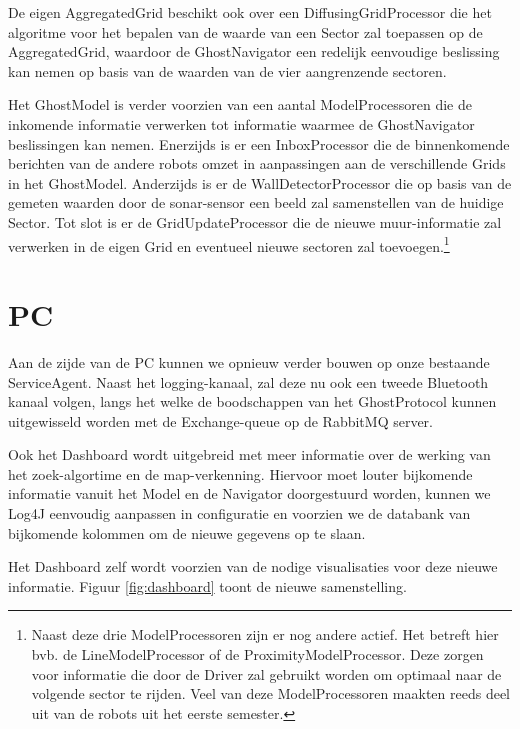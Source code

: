 \documentclass[12pt,a4paper]{report}
\begin{document}
De eigen AggregatedGrid beschikt ook over een DiffusingGridProcessor die het algoritme voor het bepalen van de waarde van een Sector zal toepassen op de AggregatedGrid, waardoor de GhostNavigator een redelijk eenvoudige beslissing kan nemen op basis van de waarden van de vier aangrenzende sectoren.

Het GhostModel is verder voorzien van een aantal ModelProcessoren die de inkomende informatie verwerken tot informatie waarmee de GhostNavigator beslissingen kan nemen. Enerzijds is er een InboxProcessor die de binnenkomende berichten van de andere robots omzet in aanpassingen aan de verschillende Grids in het GhostModel. Anderzijds is er de WallDetectorProcessor die op basis van de gemeten waarden door de sonar-sensor een beeld zal samenstellen van de huidige Sector. Tot slot is er de GridUpdateProcessor die de nieuwe muur-informatie zal verwerken in de eigen Grid en eventueel nieuwe sectoren zal toevoegen.\footnote{Naast deze drie ModelProcessoren zijn er nog andere actief. Het betreft hier bvb. de LineModelProcessor of de ProximityModelProcessor. Deze zorgen voor informatie die door de Driver zal gebruikt worden om optimaal naar de volgende sector te rijden. Veel van deze ModelProcessoren maakten reeds deel uit van de robots uit het eerste semester.}

\section{PC}

Aan de zijde van de PC kunnen we opnieuw verder bouwen op onze bestaande ServiceAgent. Naast het logging-kanaal, zal deze nu ook een tweede Bluetooth kanaal volgen, langs het welke de boodschappen van het GhostProtocol kunnen uitgewisseld worden met de Exchange-queue op de RabbitMQ server.

Ook het Dashboard wordt uitgebreid met meer informatie over de werking van het zoek-algortime en de map-verkenning. Hiervoor moet louter bijkomende informatie vanuit het Model en de Navigator doorgestuurd worden, kunnen we Log4J eenvoudig aanpassen in configuratie en voorzien we de databank van bijkomende kolommen om de nieuwe gegevens op te slaan.

Het Dashboard zelf wordt voorzien van de nodige visualisaties voor deze nieuwe informatie. Figuur \ref{fig:dashboard} toont de nieuwe samenstelling.
\end{document}
